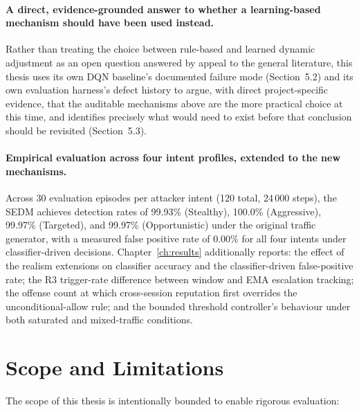 \paragraph{A direct, evidence-grounded answer to whether a learning-based
mechanism should have been used instead.}
Rather than treating the choice between rule-based and learned dynamic
adjustment as an open question answered by appeal to the general
literature, this thesis uses its own DQN baseline's documented failure mode
(Section~5.2) and its own evaluation harness's defect history to argue,
with direct project-specific evidence, that the auditable mechanisms above
are the more practical choice at this time, and identifies precisely what
would need to exist before that conclusion should be revisited
(Section~5.3).

\paragraph{Empirical evaluation across four intent profiles, extended to the
new mechanisms.}
Across 30 evaluation episodes per attacker intent (120 total, 24\,000 steps),
the SEDM achieves detection rates of 99.93\% (Stealthy), 100.0\% (Aggressive),
99.97\% (Targeted), and 99.97\% (Opportunistic) under the original traffic
generator, with a measured false positive rate of 0.00\% for all four
intents under classifier-driven decisions.
Chapter~\ref{ch:results} additionally reports: the effect of the realism
extensions on classifier accuracy and the classifier-driven false-positive
rate; the R3 trigger-rate difference between window and EMA escalation
tracking; the offense count at which cross-session reputation first
overrides the unconditional-allow rule; and the bounded threshold
controller's behaviour under both saturated and mixed-traffic conditions.

\section{Scope and Limitations}

The scope of this thesis is intentionally bounded to enable rigorous evaluation:

